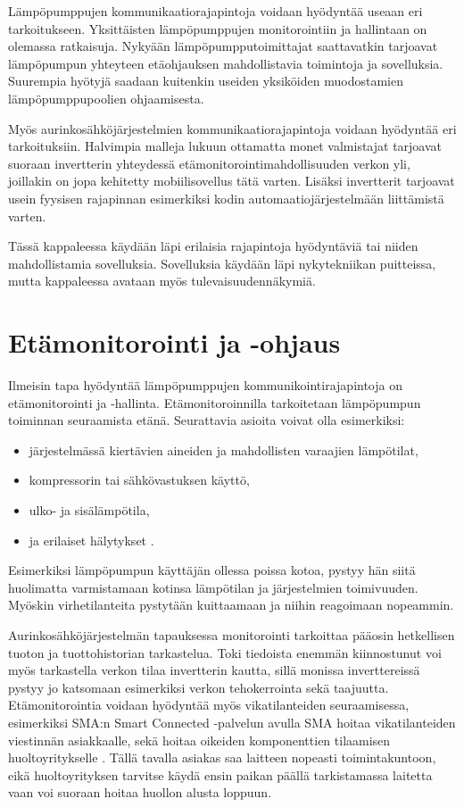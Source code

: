 Lämpöpumppujen kommunikaatiorajapintoja voidaan hyödyntää useaan eri tarkoitukseen. Yksittäisten lämpöpumppujen monitorointiin ja hallintaan on olemassa ratkaisuja. Nykyään lämpöpumpputoimittajat saattavatkin tarjoavat lämpöpumpun yhteyteen etäohjauksen mahdollistavia toimintoja ja sovelluksia. Suurempia hyötyjä saadaan kuitenkin useiden yksiköiden muodostamien lämpöpumppupoolien ohjaamisesta.

Myös aurinkosähköjärjestelmien kommunikaatiorajapintoja voidaan hyödyntää eri tarkoituksiin. Halvimpia malleja lukuun ottamatta monet valmistajat tarjoavat suoraan invertterin yhteydessä etämonitorointimahdollisuuden verkon yli, joillakin on jopa kehitetty mobiilisovellus tätä varten. Lisäksi invertterit tarjoavat usein fyysisen rajapinnan esimerkiksi kodin automaatiojärjestelmään liittämistä varten.

Tässä kappaleessa käydään läpi erilaisia rajapintoja hyödyntäviä tai niiden mahdollistamia sovelluksia. Sovelluksia käydään läpi nykytekniikan puitteissa, mutta kappaleessa avataan myös tulevaisuudennäkymiä.


\section{Etämonitorointi ja -ohjaus}

  Ilmeisin tapa hyödyntää lämpöpumppujen kommunikointirajapintoja on etämonitorointi ja -hallinta. Etämonitoroinnilla tarkoitetaan lämpöpumpun toiminnan seuraamista etänä. Seurattavia asioita voivat olla esimerkiksi:
  \begin{itemize}
    \item järjestelmässä kiertävien aineiden ja mahdollisten varaajien lämpötilat,
    \item kompressorin tai sähkövastuksen käyttö,
    \item ulko- ja sisälämpötila,
    \item ja erilaiset hälytykset \parencite{Latomaki}.
  \end{itemize}
  Esimerkiksi lämpöpumpun käyttäjän ollessa poissa kotoa, pystyy hän siitä huolimatta varmistamaan kotinsa lämpötilan ja järjestelmien toimivuuden. Myöskin virhetilanteita pystytään kuittaamaan ja niihin reagoimaan nopeammin.

  Aurinkosähköjärjestelmän tapauksessa monitorointi tarkoittaa pääosin hetkellisen tuoton ja tuottohistorian tarkastelua. Toki tiedoista enemmän kiinnostunut voi myös tarkastella verkon tilaa invertterin kautta, sillä monissa inverttereissä pystyy jo katsomaan esimerkiksi verkon tehokerrointa sekä taajuutta. Etämonitorointia voidaan hyödyntää myös vikatilanteiden seuraamisessa, esimerkiksi SMA:n Smart Connected -palvelun avulla SMA hoitaa vikatilanteiden viestinnän asiakkaalle, sekä hoitaa oikeiden komponenttien tilaamisen huoltoyritykselle \parencite{SmartConnected}. Tällä tavalla asiakas saa laitteen nopeasti toimintakuntoon, eikä huoltoyrityksen tarvitse käydä ensin paikan päällä tarkistamassa laitetta vaan voi suoraan hoitaa huollon alusta loppuun.

